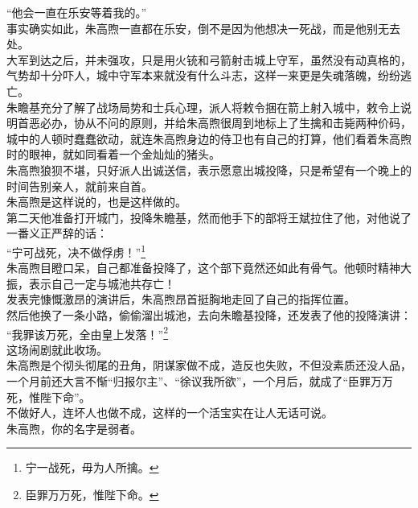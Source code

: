 \begin{multicols}{\theparacolNo}
“他会一直在乐安等着我的。”\\

事实确实如此，朱高煦一直都在乐安，倒不是因为他想决一死战，而是他别无去处。\\

大军到达之后，并未强攻，只是用火铳和弓箭射击城上守军，虽然没有动真格的，气势却十分吓人，城中守军本来就没有什么斗志，这样一来更是失魂落魄，纷纷逃亡。\\

朱瞻基充分了解了战场局势和士兵心理，派人将敕令捆在箭上射入城中，敕令上说明首恶必办，协从不问的原则，并给朱高煦很周到地标上了生擒和击毙两种价码，城中的人顿时蠢蠢欲动，就连朱高煦身边的侍卫也有自己的打算，他们看着朱高煦时的眼神，就如同看着一个金灿灿的猪头。\\

朱高煦狼狈不堪，只好派人出诚送信，表示愿意出城投降，只是希望有一个晚上的时间告别亲人，就前来自首。\\

朱高煦是这样说的，也是这样做的。\\

第二天他准备打开城门，投降朱瞻基，然而他手下的部将王斌拉住了他，对他说了一番义正严辞的话：\\

“宁可战死，决不做俘虏！”\footnote{宁一战死，毋为人所擒。}\\

朱高煦目瞪口呆，自己都准备投降了，这个部下竟然还如此有骨气。他顿时精神大振，表示自己一定与城池共存亡！\\

发表完慷慨激昂的演讲后，朱高煦昂首挺胸地走回了自己的指挥位置。\\

然后他换了一条小路，偷偷溜出城池，去向朱瞻基投降，还发表了他的投降演讲：\\

“我罪该万死，全由皇上发落！”\footnote{臣罪万万死，惟陛下命。}\\

这场闹剧就此收场。\\

朱高煦是个彻头彻尾的丑角，阴谋家做不成，造反也失败，不但没素质还没人品，一个月前还大言不惭“归报尔主”、“徐议我所欲”，一个月后，就成了“臣罪万万死，惟陛下命”。\\

不做好人，连坏人也做不成，这样的一个活宝实在让人无话可说。\\

朱高煦，你的名字是弱者。\\


\end{multicols}
